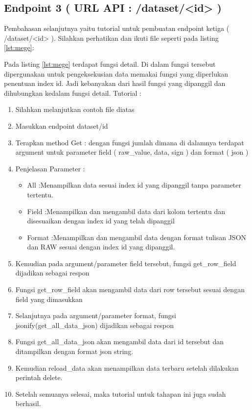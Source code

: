 \subsection{Endpoint 3 ( URL API : /dataset/<id> )}
Pembahasan selanjutnya yaitu tutorial untuk pembuatan endpoint ketiga ( /dataset/<id> ). Silahkan perhatikan dan ikuti file seperti pada listing \ref{lst:mege}:

Pada listing \ref{lst:mege} terdapat fungsi detail. Di dalam fungsi tersebut dipergunakan untuk pengeksekusian data memakai fungsi yang diperlukan penentuan index id. Jadi kebanyakan dari hasil fungsi yang dipanggil dan dihubungkan kedalam fungsi detail. 
Tutorial :
\begin{enumerate}
\item Silahkan melanjutkan contoh file diatas
\item Masukkan endpoint dataset/id
\item Terapkan method Get : dengan fungsi jumlah dimana di dalamnya terdapat argument untuk parameter field ( raw\_value, data, sign ) dan format ( json )
\item Penjelasan Parameter :
\begin{itemize}
\item All	:Menampilkan data sesuai index id yang dipanggil tanpa parameter tertentu.
\item Field	:Menampilkan dan mengambil data dari kolom tertentu dan disesuaikan dengan index id yang telah dipanggil
\item Format	:Menampilkan dan mengambil data dengan format tulisan JSON dan RAW sesuai dengan index id yang dipanggil.
\end{itemize}
\item Kemudian pada argument/parameter field tersebut, fungsi get\_row\_field dijadikan sebagai respon
\item Fungsi get\_row\_field akan mengambil data dari row tersebut sesuai dengan field yang dimasukkan 
\item Selanjutnya pada argument/parameter format, fungsi jsonify(get\_all\_data\_json) dijadikan sebagai respon
\item Fungsi get\_all\_data\_json akan mengambil data dari id tersebut dan ditampilkan dengan format json string. 
 \item Kemudian reload\_data akan menampilkan data terbaru setelah dilakukan perintah delete.
 \item Setelah semuanya selesai, maka tutorial untuk tahapan ini juga sudah berhasil.
\end{enumerate}
